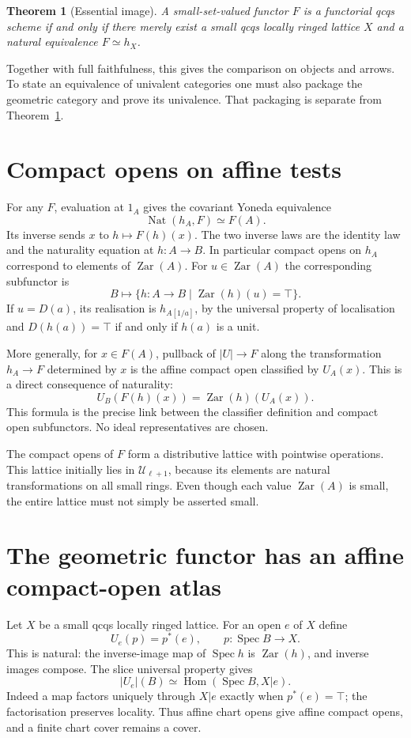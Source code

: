 \documentclass[11pt]{amsart}
\newtheorem{theorem}{Theorem}[section]
\theoremstyle{definition}\newtheorem{definition}[theorem]{Definition}
\theoremstyle{remark}\newtheorem{remark}[theorem]{Remark}
\newcommand{\UU}{\mathcal U}
\newcommand{\Hom}{\operatorname{Hom}}
\newcommand{\Nat}{\operatorname{Nat}}
\newcommand{\Spec}{\operatorname{Spec}}
\newcommand{\Zar}{\operatorname{Zar}}
\begin{document}
\begin{theorem}[Essential image]\label{thm:essential}
A small-set-valued functor $F$ is a functorial qcqs scheme if and only if
there merely exist a small qcqs locally ringed lattice $X$ and a natural
equivalence $F\simeq h_X$.
\end{theorem}
Together with full faithfulness, this gives the comparison on objects
and arrows. To state an equivalence of univalent categories one must
also package the geometric category and prove its univalence. That
packaging is separate from Theorem~\ref{thm:essential}.

\section{Compact opens on affine tests}
For any $F$, evaluation at $1_A$ gives the covariant Yoneda equivalence
\[
 \Nat(h_A,F)\simeq F(A).
\]
Its inverse sends $x$ to $h\mapsto F(h)(x)$. The two inverse laws are
the identity law and the naturality equation at $h:A\to B$.
In particular compact opens on $h_A$ correspond to elements of $\Zar(A)$.
For $u\in\Zar(A)$ the corresponding subfunctor is
\[
 B\longmapsto\{h:A\to B\mid\Zar(h)(u)=\top\}.
\]
If $u=D(a)$, its realisation is $h_{A[1/a]}$, by the universal property
of localisation and $D(h(a))=\top$ if and only if $h(a)$ is a unit.

More generally, for $x\in F(A)$, pullback of $|U|\to F$ along the
transformation $h_A\to F$ determined by $x$ is the affine compact open
classified by $U_A(x)$. This is a direct consequence of naturality:
\[
 U_B(F(h)(x))=\Zar(h)(U_A(x)).
\]
This formula is the precise link between the classifier definition and
compact open subfunctors. No ideal representatives are chosen.

The compact opens of $F$ form a distributive lattice with pointwise
operations. This lattice initially lies in $\UU_{\ell+1}$, because its
elements are natural transformations on all small rings. Even though
each value $\Zar(A)$ is small, the entire lattice must not simply be
asserted small.

\section{The geometric functor has an affine compact-open atlas}
Let $X$ be a small qcqs locally ringed lattice. For an open $e$ of $X$
define
\[
 U_e(p)=p^*(e),\qquad p:\Spec B\to X.
\]
This is natural: the inverse-image map of $\Spec h$ is $\Zar(h)$,
and inverse images compose. The slice universal property gives
\[
 |U_e|(B)\simeq\Hom(\Spec B,X|e).
\]
Indeed a map factors uniquely through $X|e$ exactly when $p^*(e)=\top$;
the factorisation preserves locality. Thus affine chart opens give
affine compact opens, and a finite chart cover remains a cover.
\end{document}
